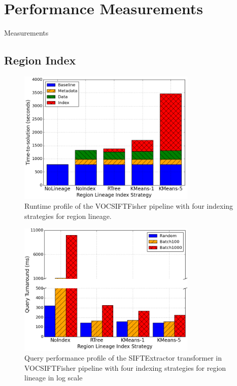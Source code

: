 \documentclass{sig-alternate}
\begin{document}
\section{Performance Measurements}
\label{sec:Perf}
Measurements

\subsection{Region Index}
\label{sec:Perf-Index}

\begin{figure}[h]
\begin{center}
    \includegraphics[width=85mm]{pictures/SIFTIndex-Time}
\caption {Runtime profile of the VOCSIFTFisher pipeline with four indexing strategies for region lineage.
    \label{fig:sift-time}
}
\end{center}
\end{figure}

\begin{figure}[h]
\begin{center}
    \includegraphics[width=85mm]{pictures/SIFTQuery-Time}
\caption {Query performance profile of the SIFTExtractor transformer in VOCSIFTFisher pipeline with four indexing strategies for region lineage in log scale
    \label{fig:sift-query}
}
\end{center}
\end{figure}
\end{document}
